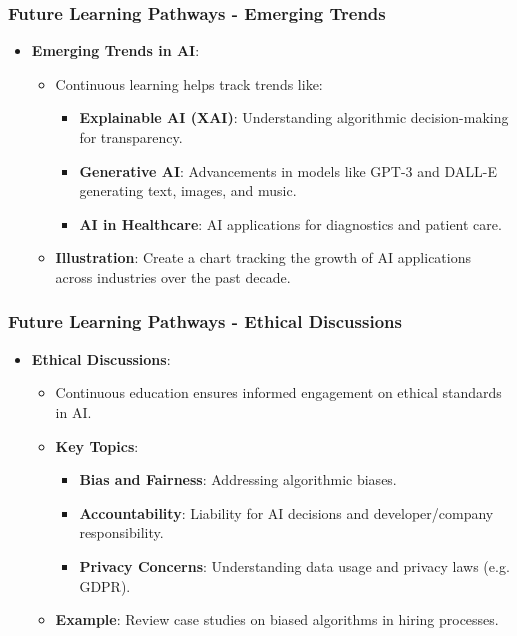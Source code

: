 \documentclass[aspectratio=169]{beamer}
\begin{document}
\begin{frame}[fragile]
    \frametitle{Future Learning Pathways - Emerging Trends}
    \begin{itemize}
        \item \textbf{Emerging Trends in AI}:
            \begin{itemize}
                \item Continuous learning helps track trends like:
                \begin{itemize}
                    \item \textbf{Explainable AI (XAI)}: Understanding algorithmic decision-making for transparency.
                    \item \textbf{Generative AI}: Advancements in models like GPT-3 and DALL-E generating text, images, and music.
                    \item \textbf{AI in Healthcare}: AI applications for diagnostics and patient care.
                \end{itemize}
                \item \textbf{Illustration}: Create a chart tracking the growth of AI applications across industries over the past decade.
            \end{itemize}
    \end{itemize}
\end{frame}

\begin{frame}[fragile]
    \frametitle{Future Learning Pathways - Ethical Discussions}
    \begin{itemize}
        \item \textbf{Ethical Discussions}:
            \begin{itemize}
                \item Continuous education ensures informed engagement on ethical standards in AI.
                \item \textbf{Key Topics}:
                \begin{itemize}
                    \item \textbf{Bias and Fairness}: Addressing algorithmic biases.
                    \item \textbf{Accountability}: Liability for AI decisions and developer/company responsibility.
                    \item \textbf{Privacy Concerns}: Understanding data usage and privacy laws (e.g. GDPR).
                \end{itemize}
                \item \textbf{Example}: Review case studies on biased algorithms in hiring processes.
            \end{itemize}
\end{itemize}
\end{frame}
\end{document}
